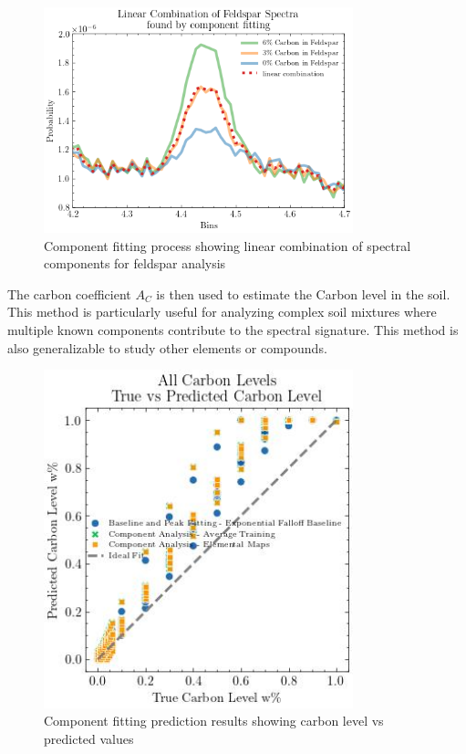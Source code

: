 \documentclass[review]{elsarticle}
\begin{document}
\begin{figure}[H]
\centering
\includegraphics[width=0.8\textwidth]{../Figures/Analysis/linear_combination_feldspar.png}
\caption{Component fitting process showing linear combination of spectral components for feldspar analysis}
\label{fig:component_fitting}
\end{figure}

The carbon coefficient $A_C$ is then used to estimate the Carbon level in the soil. This method is particularly useful for analyzing complex soil mixtures where multiple known components contribute to the spectral signature. This method is also generalizable to study other elements or compounds.

\begin{figure}[H]
\centering
\includegraphics[width=0.8\textwidth]{../Figures/Analysis/carbon_level_vs_predicted_component_analysis.jpg}
\caption{Component fitting prediction results showing carbon level vs predicted values}
\label{fig:component_predictions}
\end{figure}
\end{document}
